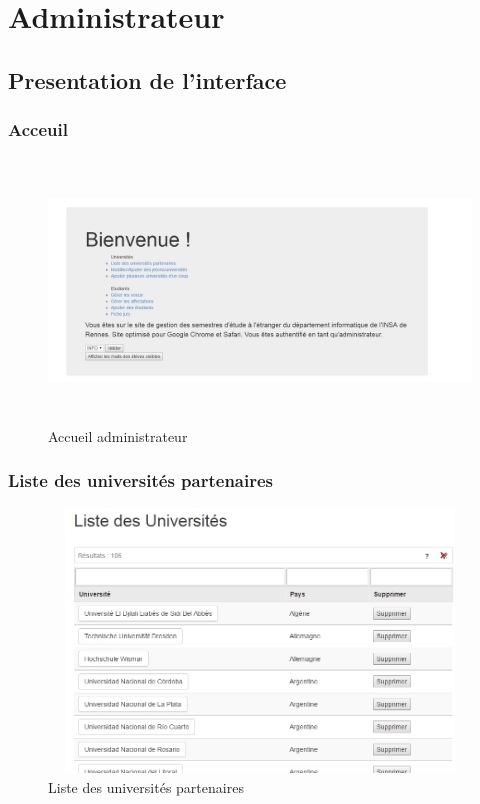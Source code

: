 \chapter{Administrateur}

\section{Presentation de l'interface}

\subsection{Acceuil}
 \begin{figure}[H]
 	\centering
 	
 	\includegraphics[width=14cm,height=7cm]{Images/Admin/menu_acceuil_admin.png}
 	\caption{Accueil administrateur}
 	\label{aa}
 \end{figure}
 
 
 \subsection{Liste des universités partenaires}
 \begin{figure}[H]
 	\centering
 	
 	\includegraphics[width=14cm,height=7cm]{Images/Admin/liste_univ_admin.png}
 	\caption{Liste des universités partenaires}
 	\label{lua}
 \end{figure}
 
